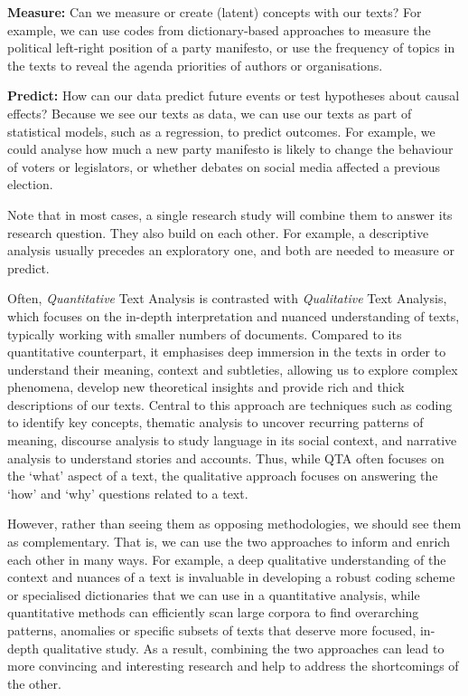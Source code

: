\documentclass[
]{book}
\begin{document}
\textbf{Measure:} Can we measure or create (latent) concepts with our texts? For example, we can use codes from dictionary-based approaches to measure the political left-right position of a party manifesto, or use the frequency of topics in the texts to reveal the agenda priorities of authors or organisations.

\textbf{Predict:} How can our data predict future events or test hypotheses about causal effects? Because we see our texts as data, we can use our texts as part of statistical models, such as a regression, to predict outcomes. For example, we could analyse how much a new party manifesto is likely to change the behaviour of voters or legislators, or whether debates on social media affected a previous election.

Note that in most cases, a single research study will combine them to answer its research question. They also build on each other. For example, a descriptive analysis usually precedes an exploratory one, and both are needed to measure or predict.

Often, \emph{Quantitative} Text Analysis is contrasted with \emph{Qualitative} Text Analysis, which focuses on the in-depth interpretation and nuanced understanding of texts, typically working with smaller numbers of documents. Compared to its quantitative counterpart, it emphasises deep immersion in the texts in order to understand their meaning, context and subtleties, allowing us to explore complex phenomena, develop new theoretical insights and provide rich and thick descriptions of our texts. Central to this approach are techniques such as coding to identify key concepts, thematic analysis to uncover recurring patterns of meaning, discourse analysis to study language in its social context, and narrative analysis to understand stories and accounts. Thus, while QTA often focuses on the `what' aspect of a text, the qualitative approach focuses on answering the `how' and `why' questions related to a text.

However, rather than seeing them as opposing methodologies, we should see them as complementary. That is, we can use the two approaches to inform and enrich each other in many ways. For example, a deep qualitative understanding of the context and nuances of a text is invaluable in developing a robust coding scheme or specialised dictionaries that we can use in a quantitative analysis, while quantitative methods can efficiently scan large corpora to find overarching patterns, anomalies or specific subsets of texts that deserve more focused, in-depth qualitative study. As a result, combining the two approaches can lead to more convincing and interesting research and help to address the shortcomings of the other.
\end{document}

